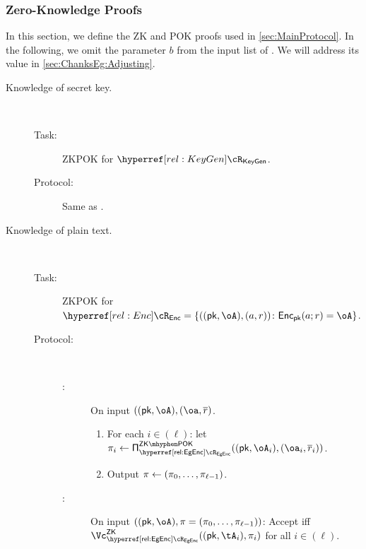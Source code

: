 \subsubsection{Zero-Knowledge  Proofs }\label{sec:ChanksEg:Proofs}
In this section, we define the ZK and POK proofs used in  \cref{sec:MainProtocol}.
In the following, we omit the parameter $b$ from the input list of  \Dec.  We will address its value in \cref{sec:ChanksEg:Adjusting}.


\begin{description}
	\item[Knowledge of secret key.] ~
	
	\begin{description}
		
		
		
		\item[Task:] ZKPOK for $\rKeyGen$.%
		
		
		
		\item[Protocol:] Same as \piZKPOK{\rEgKeyGen}. 
		
	\end{description}
	
	
	\item[Knowledge of plain text.] ~
	
	

	\begin{description}
		\item[Task:] ZKPOK for $\rEnc=\rEncDef$.\label{rel:Enc}
		
		\item[Protocol:]~
		
		\begin{description}
			\item[\Pc:] On  input  $((\pk,\oA),(\oa,\orr)$.
			\begin{enumerate}
				\item For each $i\in (\ell)$: let  $\pi_i \asn \piZKPOK{\rEgEnc}((\pk,\oA_i),(\oa_i,\orr_i))$. 
				
				\item Output $\pi \leftarrow (\pi_0,\ldots, \pi_{\ell-1})$.
				
			\end{enumerate}
			
			
			\item[\Vc:] On  input  $((\pk,\oA),\pi = (\pi_0,\ldots, \pi_{\ell-1}))$: Accept iff  $\vZK{\rEgEnc}((\pk,\tA_i), \pi_i)$ for all $i\in (\ell)$.
			
		\end{description} 
		

\end{description}
\end{description}
